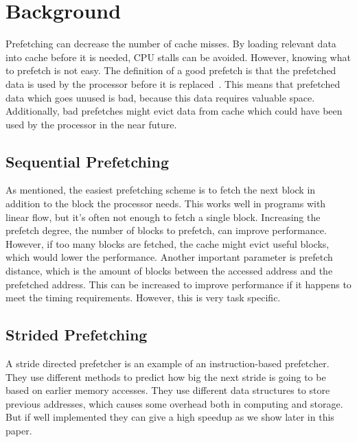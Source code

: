 \section{Background} %



Prefetching can decrease the number of cache misses. By loading
relevant data into cache before it is needed, CPU stalls can be
avoided. However, knowing what to prefetch is not easy. The definition
of a good prefetch is that the prefetched data is used by the
processor before it is
replaced~\cite{srinivasan_davidson_tyson_2004}. This means that
prefetched data which goes unused is bad, because this data requires
valuable space. Additionally, bad prefetches might evict data from
cache which could have been used by the processor in the near future.

\subsection{Sequential Prefetching}

As mentioned, the easiest prefetching scheme is to fetch the next
block in addition to the block the processor needs. This works well in
programs with linear flow, but it's often not enough to fetch a single
block. Increasing the prefetch degree, the number of blocks to
prefetch, can improve performance. However, if too many blocks are
fetched, the cache might evict useful blocks, which would lower the
performance. Another important parameter is prefetch distance, which
is the amount of blocks between the accessed address and the
prefetched address. This can be increased to improve performance if it
happens to meet the timing requirements. However, this is very task
specific.

\subsection{Strided Prefetching}

A stride directed prefetcher is an example of an instruction-based
prefetcher. They use different methods to predict how big the next
stride is going to be based on earlier memory accesses. They use
different data structures to store previous addresses, which causes
some overhead both in computing and storage. But if well implemented
they can give a high speedup as we show later in this paper.

